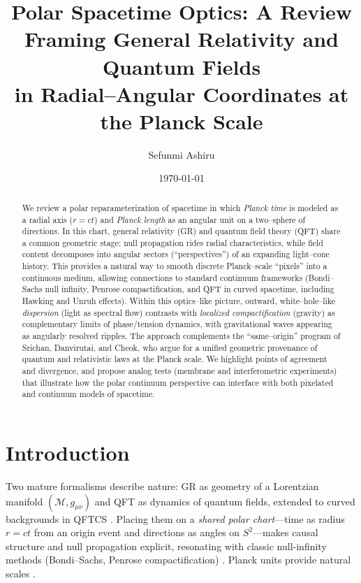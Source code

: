 \documentclass[12pt]{article}
\title{Polar Spacetime Optics: A Review Framing General Relativity and Quantum Fields\\
in Radial--Angular Coordinates at the Planck Scale}
\author{Sefunmi Ashiru}
\date{\today}
\newcommand{\M}{\mathcal{M}}
\newcommand{\g}{g}
\begin{document}
\maketitle

\begin{abstract}
We review a polar reparameterization of spacetime in which \emph{Planck time} is modeled as a radial axis ($r=ct$) and \emph{Planck length} as an angular unit on a two--sphere of directions. In this chart, general relativity (GR) and quantum field theory (QFT) share a common geometric stage: null propagation rides radial characteristics, while field content decomposes into angular sectors (``perspectives'') of an expanding light--cone history. This provides a natural way to smooth discrete Planck--scale ``pixels'' into a continuous medium, allowing connections to standard continuum frameworks (Bondi--Sachs null infinity, Penrose compactification, and QFT in curved spacetime, including Hawking and Unruh effects). Within this optics--like picture, outward, white--hole--like \emph{dispersion} (light as spectral flow) contrasts with \emph{localized compactification} (gravity) as complementary limits of phase/tension dynamics, with gravitational waves appearing as angularly resolved ripples. The approach complements the ``same--origin'' program of Srichan, Danvirutai, and Cheok, who argue for a unified geometric provenance of quantum and relativistic laws at the Planck scale. We highlight points of agreement and divergence, and propose analog tests (membrane and interferometric experiments) that illustrate how the polar continuum perspective can interface with both pixelated and continuum models of spacetime.
\end{abstract}

\tableofcontents

\section{Introduction}
Two mature formalisms describe nature: GR as geometry of a Lorentzian manifold $(\M,\g_{\mu\nu})$ and QFT as dynamics of quantum fields, extended to curved backgrounds in QFTCS \citep{BirrellDavies1982,ParkerToms2009,Carroll2003}. Placing them on a \emph{shared polar chart}---time as radius $r=ct$ from an origin event and directions as angles on $S^2$---makes causal structure and null propagation explicit, resonating with classic null-infinity methods (Bondi--Sachs, Penrose compactification) \citep{Bondi1962,Sachs1962,Penrose1964,NullInfinity,AsympFlat}. Planck units provide natural scales \citep{PlanckUnits}.
\end{document}
